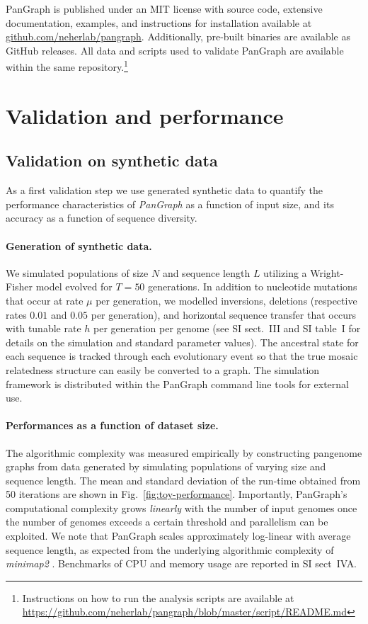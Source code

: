 \documentclass[aps,rmp,preprint,superscriptaddress,10pt,linenumbers]{revtex4-1}
\newcommand{\SIsynthdata}{III}
\newcommand{\SIsimBench}{IV}
\begin{document}
PanGraph is published under an MIT license with source code, extensive documentation, examples, and instructions for installation available at \url{github.com/neherlab/pangraph}.
Additionally, pre-built binaries are available as GitHub releases.
All data and scripts used to validate PanGraph are available within the same repository.\footnote{Instructions on how to run the analysis scripts are available at \url{https://github.com/neherlab/pangraph/blob/master/script/README.md}}

\section{Validation and performance}

\subsection{Validation on synthetic data}

As a first validation step we use generated synthetic data to quantify the performance characteristics of \textit{PanGraph} as a function of input size, and its accuracy as a function of sequence diversity.

\paragraph*{Generation of synthetic data.}

We simulated populations of size $N$ and sequence length $L$ utilizing a Wright-Fisher model \cite{hudson2002generating} evolved for $T=50$ generations.
In addition to nucleotide mutations that occur at rate $\mu$ per generation, we modelled inversions, deletions (respective rates $0.01$ and $0.05$ per generation), and horizontal sequence transfer that occurs with tunable rate $h$ per generation per genome (see SI sect.~{\SIsynthdata} and SI table~I for details on the simulation and standard parameter values).
The ancestral state for each sequence is tracked through each evolutionary event so that the true mosaic relatedness structure can easily be converted to a graph.
The simulation framework is distributed within the PanGraph command line tools for external use.

\paragraph*{Performances as a function of dataset size.}
The algorithmic complexity was measured empirically by constructing pangenome graphs from data generated by simulating populations of varying size and sequence length.
The mean and standard deviation of the run-time obtained from 50 iterations are shown in Fig.~\ref{fig:toy-performance}.
Importantly, PanGraph's computational complexity grows \emph{linearly} with the number of input genomes once the number of genomes exceeds a certain threshold and parallelism can be exploited.
We note that PanGraph scales approximately log-linear with average sequence length, as expected from the underlying algorithmic complexity of \textit{minimap2} \cite{li2018minimap2}.
Benchmarks of CPU and memory usage are reported in SI sect~{\SIsimBench}A.
\end{document}
